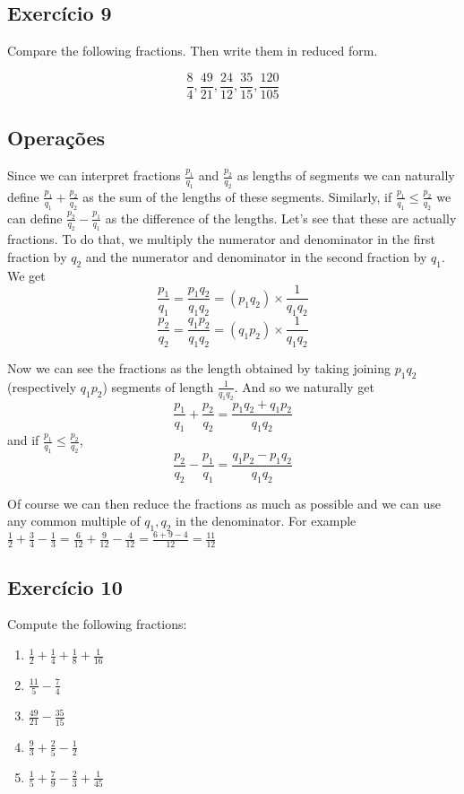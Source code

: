 \subsection*{Exercício 9}

Compare the following fractions. Then write them in reduced form.

$$\frac{8}{4},\frac{49}{21},\frac{24}{12},\frac{35}{15},\frac{120}{105}$$

\subsection*{Operações}

Since we can interpret fractions $\frac{p_1}{q_1}$ and $\frac{p_2}{q_2}$ as
lengths of segments we can naturally define
$\frac{p_1}{q_1} + \frac{p_2}{q_2}$ as the sum of the lengths of these
segments. Similarly, if $\frac{p_1}{q_1} \leq \frac{p_2}{q_2}$ we can
define $\frac{p_2}{q_2} - \frac{p_1}{q_1}$ as the difference of the lengths.
Let's see that these are actually fractions. To do that, we multiply
the numerator and denominator in the first fraction by $q_2$ and
the numerator and denominator in the second fraction by $q_1$. We get
$$
\frac{p_1}{q_1} = \frac{p_1 q_2}{q_1 q_2} = {(p_1 q_2)} \times \frac{1}{q_1 q_2}
$$
$$
\frac{p_2}{q_2} = \frac{q_1 p_2}{q_1 q_2} = {(q_1 p_2)} \times \frac{1}{q_1 q_2}
$$

Now we can see the fractions as the length obtained by taking joining
${p_1 q_2}$ (respectively ${q_1 p_2}$) segments of length
$\frac{1}{q_1 q_2}$. And so we naturally get
$$
\frac{p_1}{q_1} + \frac{p_2}{q_2} = \frac{{p_1q_2}+{q_1p_2}}{q_1q_2}
$$
and if $\frac{p_1}{q_1} \leq \frac{p_2}{q_2}$,
$$
\frac{p_2}{q_2} - \frac{p_1}{q_1} = \frac{{q_1p_2}-{p_1q_2}}{q_1q_2}
$$

Of course we can then reduce the fractions as much as possible and we can use
any common multiple of $q_1,q_2$ in the denominator. For example
$\frac{1}{2}+\frac{3}{4}-\frac{1}{3} =
\frac{6}{12}+\frac{9}{12}-\frac{4}{12}=\frac{6+9-4}{12} = \frac{11}{12}$

\subsection*{Exercício 10}

Compute the following fractions:

\begin{enumerate}
  \item $\frac{1}{2}+\frac{1}{4}+\frac{1}{8}+\frac{1}{16}$
  \item $\frac{11}{5}-\frac{7}{4}$
  \item $\frac{49}{21} - \frac{35}{15}$
  \item $\frac{9}{3}+\frac{2}{5}-\frac{1}{2}$
  \item $\frac{1}{5}+\frac{7}{9}-\frac{2}{3}+\frac{1}{45}$
\end{enumerate}

